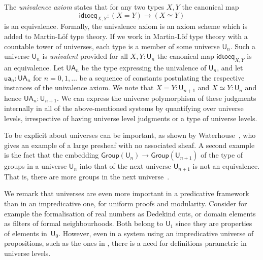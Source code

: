 \documentclass[11pt,a4paper]{article}
\theoremstyle{definition}
\newcommand{\UU}{\mathsf{U}}
\newcommand{\Level}{\mathsf{level}}
\newcommand{\Group}{\mathsf{Group}}
\newcommand{\idtoeq}{\mathsf{idtoeq}}
\newcommand{\ua}{\mathsf{ua}}
\newcommand{\UA}{\mathsf{UA}}
\begin{document}
The \emph{univalence axiom} states that for any two types $X,Y$ the canonical map
$$
\idtoeq_{X,Y} : (X=Y)\to (X\simeq Y)
$$
is an equivalence.
Formally, the univalence axiom is an axiom scheme which is added to
Martin-Löf type theory.
If we work in Martin-Löf type theory with a countable tower of universes,
each type is a member of some universe $\UU_n$.
Such a universe $\UU_n$ is {\em univalent} provided for all $X,Y : \UU_n$ the
canonical map $\idtoeq_{X,Y}$ is an equivalence.
Let $\UA_n$ be the type expressing the univalence of $\UU_n$, and let
$\ua_n : \UA_n$ for $n = 0,1,\ldots$ be a sequence of constants postulating
the respective instances of the univalence axiom.
We note that $X = Y : \UU_{n+1}$ and $X\simeq Y : \UU_n$ and
hence $\UA_n : \UU_{n+1}$. We can express the universe polymorphism of these judgments internally in all of the above-mentioned systems by quantifying over universe levels, irrespective of having universe level judgments or a type of universe levels.

To be explicit about universes can be important, as shown by Waterhouse~\cite{waterhouse:sheaves,chambert-loir:universes-matter}, who gives an example of a large presheaf with no associated sheaf. A second example is the fact that the embedding
 $\Group(\UU_n)\rightarrow \Group(\UU_{n+1})$ of the type of groups in a universe $\UU_n$ into that of the next universe $\UU_{n+1}$ is not an equivalence. That is, there are more groups in the next universe~\cite{bcde:largegroup}.

 We remark that universes are even more important in a predicative framework
than in an impredicative one, for uniform proofs and modularity.
Consider for example the formalisation of real numbers as Dedekind cuts,
or domain elements as filters of formal neighbourhoods. Both belong to $\UU_1$ since they are properties of elements in~$\UU_0$.
However, even in a system using an impredicative universe of propositions,
such as the ones in \cite{Huet87,moura:lean}, there is a need for
definitions parametric in universe levels.




\end{document}
